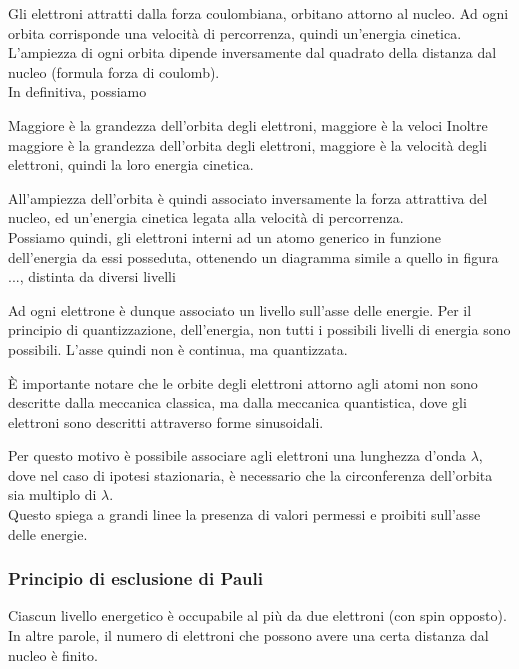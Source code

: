 \documentclass[../template]{subfiles}
\begin{document}
Gli elettroni attratti dalla forza coulombiana, orbitano attorno al nucleo. Ad ogni orbita corrisponde una velocità di percorrenza,
quindi un'energia cinetica. L'ampiezza di ogni orbita dipende inversamente dal quadrato della distanza dal nucleo (formula forza di coulomb).
\\
In definitiva, possiamo


Maggiore è la grandezza dell'orbita degli elettroni, maggiore è la veloci
Inoltre maggiore è la grandezza dell'orbita degli elettroni, maggiore è la velocità degli elettroni, quindi la loro energia cinetica.

All'ampiezza dell'orbita è quindi associato inversamente la forza attrattiva del nucleo, ed un'energia cinetica legata alla velocità di percorrenza.
\\
Possiamo quindi, gli elettroni interni ad un atomo generico in funzione dell'energia da essi posseduta, ottenendo un diagramma simile a quello in figura ..., distinta da diversi livelli

\begin{figure}[h]
    \centering
\end{figure}

Ad ogni elettrone è dunque associato un livello sull'asse delle energie.
Per il principio di quantizzazione, dell'energia, non tutti i possibili livelli di energia sono possibili. L'asse quindi non è continua, ma quantizzata.

È importante notare che le orbite degli elettroni attorno agli atomi non sono descritte dalla meccanica classica, ma dalla meccanica quantistica, dove gli elettroni sono descritti attraverso forme sinusoidali.

Per questo motivo è possibile associare agli elettroni una lunghezza d'onda $\lambda$, dove nel caso di ipotesi stazionaria, è necessario che la circonferenza dell'orbita sia multiplo di $\lambda$.
\\
Questo spiega a grandi linee la presenza di valori permessi e proibiti sull'asse delle energie.

\subsubsection{Principio di esclusione di Pauli}
Ciascun livello energetico è occupabile al più da due elettroni (con spin opposto). In altre parole, il numero di elettroni che possono avere una certa distanza dal nucleo è finito.
\end{document}
